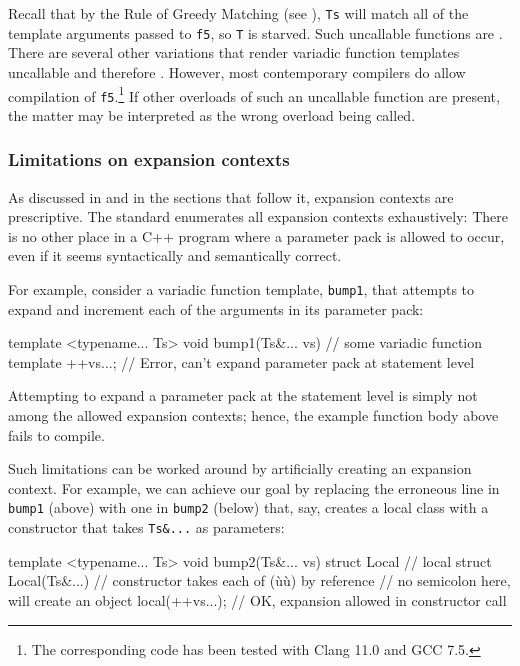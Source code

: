 \noindent Recall that by the Rule of Greedy Matching (see ), \lstinline!Ts! will match all of the template
arguments passed to \lstinline!f5!, so \lstinline!T! is starved. Such
uncallable functions are . There are several other
variations that render variadic function templates uncallable and
therefore . However, most contemporary compilers do allow
compilation of \lstinline!f5!.{\cprotect\footnote{The corresponding code
  has been tested with Clang 11.0 and GCC 7.5.}} If other overloads of
such an uncallable function are present, the matter may be interpreted
as the wrong overload being called.

\subsubsection[Limitations on expansion contexts]{Limitations on expansion contexts}\label{limitations-on-expansion-contexts}

As discussed in  and in the sections
that follow it, expansion contexts are prescriptive. The standard
enumerates all expansion contexts exhaustively: There is no other place
in a C++ program where a parameter pack is allowed to occur, even if it
seems syntactically and semantically correct.

For example, consider a variadic function template, \lstinline!bump1!, that
attempts to expand and increment each of the arguments in its parameter
pack:

\begin{emcppslisting}
template <typename... Ts>
void bump1(Ts&... vs)  // some variadic function template
{
    ++vs...;           // Error, can't expand parameter pack at statement level
}
\end{emcppslisting}
    

\noindent Attempting to expand a parameter pack at the statement level is simply
not among the allowed expansion contexts; hence, the example function
body above fails to compile.

Such limitations can be worked around by artificially creating an
expansion context. For example, we can achieve our goal by replacing the
erroneous line in \lstinline!bump1! (above) with one in \lstinline!bump2!
(below) that, say, creates a local class with a constructor that takes
\lstinline!Ts&...! as parameters:

\begin{emcppslisting}
template <typename... Ts>
void bump2(Ts&... vs)
{
    struct Local          // local struct
    {
        Local(Ts&...) {}  // constructor takes each of (ù{}ù) by reference
    }                     // no semicolon here, will create an object
    local(++vs...);       // OK, expansion allowed in constructor call
}
\end{emcppslisting}
    

